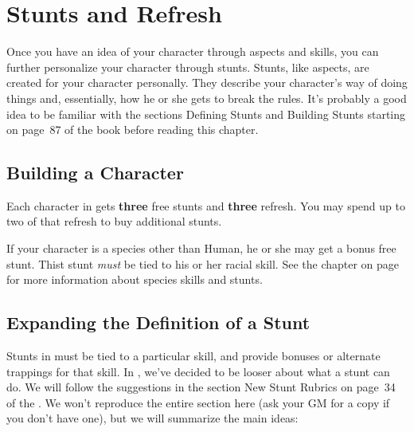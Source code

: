 \documentclass[12pt,titlepage,openany]{book}
\begin{document}
\chapter{Stunts and Refresh}\label{chap:stunts}

Once you have an idea of your character through aspects and skills, you can
further personalize your character through stunts. Stunts, like aspects, are
created for your character personally. They describe your character's way of
doing things and, essentially, how he or she gets to break the rules. It's
probably a good idea to be familiar with the sections Defining Stunts and
Building Stunts starting on page~87 of the \FateCore{} book before reading this
chapter.

\section{Building a Character}\label{sec:building}
Each character in \StarTrekFate{} gets \textbf{three} free stunts and
\textbf{three} refresh. You may spend up to two of that refresh to buy
additional stunts.

If your character is a species other than Human, he or she may get a bonus free
stunt. Thist stunt \emph{must} be tied to his or her racial skill. See the
 chapter on page~\pageref{chap:species} for more
information about species skills and stunts.

\section{Expanding the Definition of a Stunt}\label{sec:aspect-stunts}
Stunts in \FateCore{} must be tied to a particular skill, and provide bonuses
or alternate trappings for that skill. In \StarTrekFate{}, we've decided to be
looser about what a stunt can do. We will follow the suggestions in the section
New Stunt Rubrics on page~34 of the \FateSystemToolkit{}. We won't reproduce
the entire section here (ask your GM for a copy if you don't have one), but we
will summarize the main ideas:
\end{document}
